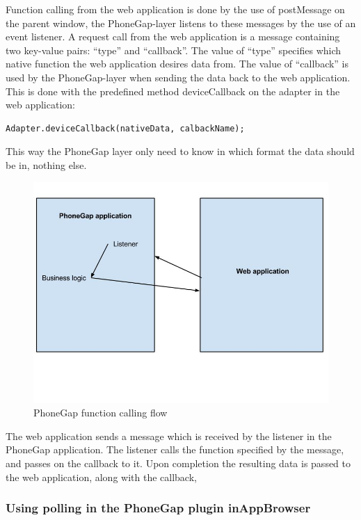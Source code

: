 Function calling from the web application is done by the use of postMessage on the parent window, the PhoneGap-layer listens to these messages by the use of an event listener. A request call from the web application is a message containing two key-value pairs: “type” and “callback”. The value of “type” specifies which native function the web application desires data from. The value of “callback” is used by the PhoneGap-layer when sending the data back to the web application. This is done with the predefined method deviceCallback on the adapter in the web application:

\begin{verbatim}
Adapter.deviceCallback(nativeData, calbackName);
\end{verbatim}

This way the PhoneGap layer only need to know in which format the data should be in, nothing else. 
\begin{figure}[ht!]
    \centering
    \includegraphics[width=120mm,natwidth=800,natheight=600]{./img/phoneGapFlow.jpg}
    \caption{PhoneGap function calling flow \label{caption-phonegap-flow}}
\end{figure}
\newline
The web application sends a message which is received by the listener in the PhoneGap application. The listener calls the function specified by the message, and passes on the callback to it. Upon completion the resulting data is passed to the web application, along with the callback, 

\subsubsection{Using polling in the PhoneGap plugin inAppBrowser}

